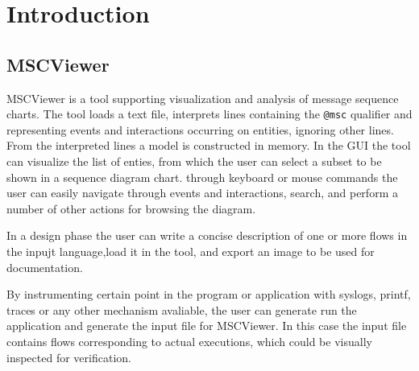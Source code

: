 \documentclass[11pt, twoside, titlepage]{book}
\date{\today}
\makeatletter
\newcommand{\prog}{MSCViewer}
\newcommand{\eventprefix}{\texttt{@msc}}
\renewcommand\tableofcontents{%
    \if@twocolumn
      \@restonecoltrue\onecolumn
    \else
      \@restonecolfalse
    \fi
    \chapter*{\contentsname}%
        \@mkboth{%
           \MakeUppercase\contentsname}{\MakeUppercase\contentsname}%
    \@starttoc{toc}%
    \if@restonecol\twocolumn\fi
    }
\makeatother
\begin{document}
\clearpage
\thispagestyle{empty}

\tableofcontents 

\cleardoublepage

\setcounter{page}{1}


\chapter{Introduction}

\section{\prog}
\prog{} is a tool supporting visualization and analysis of message sequence
charts. The tool loads a text file, interprets lines containing the
\eventprefix{} qualifier and representing events and interactions occurring on
entities, ignoring other lines. From the interpreted lines a model is
constructed in memory. In the GUI the tool can visualize the list of enties,
from which the user can select a subset to be shown in a sequence diagram chart.
through keyboard or mouse commands the user can easily navigate through events
and interactions, search, and perform a number of other actions for browsing the
diagram.

In a design phase the user can write a concise description of one or
more flows in the inpujt language,load it in the tool, and export an image to 
be used for documentation.

By instrumenting certain point in the program or application with syslogs,
printf, traces or any other mechanism avaliable, the user can generate run the
application and generate the input file for \prog{}. In this case the input
file contains flows corresponding to actual executions, which could be visually
inspected for verification.
\end{document}
